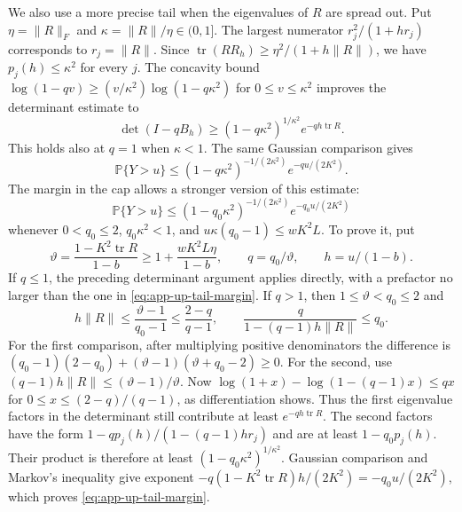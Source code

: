 \documentclass[11pt,a4paper]{article}
\numberwithin{equation}{section}
\begin{document}
We also use a more precise tail when the eigenvalues of $R$ are spread out.
Put $\eta=\|R\|_F$ and $\kappa=\|R\|/\eta\in(0,1]$.
The largest numerator $r_j^2/(1+hr_j)$ corresponds to $r_j=\|R\|$.
Since $\operatorname{tr}(RR_h)\ge\eta^2/(1+h\|R\|)$,
we have $p_j(h)\le\kappa^2$ for every $j$.
The concavity bound
$\log(1-qv)\ge(v/\kappa^2)\log(1-q\kappa^2)$ for
$0\le v\le\kappa^2$ improves the determinant estimate to
\[
 \det(I-qB_h)\ge(1-q\kappa^2)^{1/\kappa^2}
                          e^{-qh\operatorname{tr}R}.
\]
This holds also at $q=1$ when $\kappa<1$.
The same Gaussian comparison gives
\begin{equation}\label{eq:app-up-tail-kappa}
 \mathbb P\{Y>u\}\le
 (1-q\kappa^2)^{-1/(2\kappa^2)}e^{-qu/(2K^2)}.
\end{equation}
The margin in the cap allows a stronger version of this estimate:
\begin{equation}\label{eq:app-up-tail-margin}
 \mathbb P\{Y>u\}\le
 (1-q_0\kappa^2)^{-1/(2\kappa^2)}e^{-q_0u/(2K^2)}
\end{equation}
whenever $0<q_0\le2$, $q_0\kappa^2<1$, and
$u\kappa(q_0-1)\le wK^2L$.
To prove it, put
\[
 \vartheta=\frac{1-K^2\operatorname{tr}R}{1-b}
 \ge1+\frac{wK^2L\eta}{1-b},\qquad q=q_0/\vartheta,
 \qquad h=u/(1-b).
\]
If $q\le1$, the preceding determinant argument applies directly,
with a prefactor no larger than the one in \eqref{eq:app-up-tail-margin}.
If $q>1$, then $1\le\vartheta<q_0\le2$ and
\[
 h\|R\|\le\frac{\vartheta-1}{q_0-1}
 \le\frac{2-q}{q-1},\qquad
 \frac{q}{1-(q-1)h\|R\|}\le q_0.
\]
For the first comparison, after multiplying positive denominators the
difference is
$(q_0-1)(2-q_0)+(\vartheta-1)(\vartheta+q_0-2)\ge0$.
For the second, use
$(q-1)h\|R\|\le(\vartheta-1)/\vartheta$.
Now
$\log(1+x)-\log(1-(q-1)x)\le qx$ for
$0\le x\le(2-q)/(q-1)$, as differentiation shows.
Thus the first eigenvalue factors in the determinant still contribute
at least $e^{-qh\operatorname{tr}R}$.
The second factors have the form
$1-qp_j(h)/(1-(q-1)hr_j)$ and are at least $1-q_0p_j(h)$.
Their product is therefore at least
$(1-q_0\kappa^2)^{1/\kappa^2}$.
Gaussian comparison and Markov's inequality give exponent
$-q(1-K^2\operatorname{tr}R)h/(2K^2)=-q_0u/(2K^2)$,
which proves \eqref{eq:app-up-tail-margin}.
\end{document}
